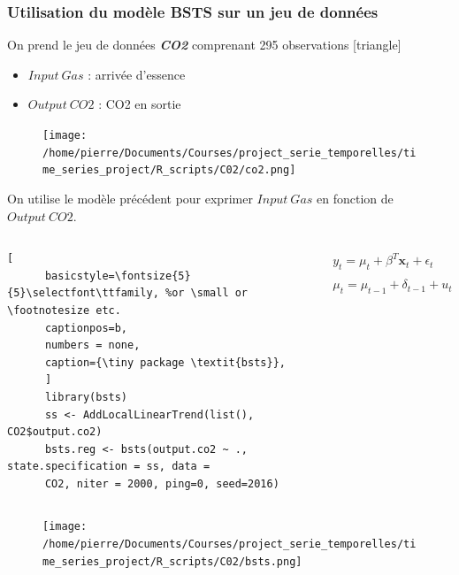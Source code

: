 \documentclass{presentation_template}
\begin{document}
\begin{frame}
  \frametitle{Utilisation du modèle BSTS sur un jeu de données}
  
  On prend le jeu de données \textbf{\textit{CO2}} comprenant 295 observations
  [triangle]
  \begin{itemize}
    \item $Input\ Gas$ : arrivée d'essence
    \item $Output\ CO2$ : CO2 en sortie
  \end{itemize}
  \begin{figure}
    \texttt{[image: /home/pierre/Documents/Courses/project\_serie\_temporelles/time\_series\_project/R\_scripts/C02/co2.png]} 
  \end{figure}
\end{frame}

\begin{frame}[fragile]
  \small On utilise le modèle précédent pour exprimer $Input\ Gas$ en fonction de $Output\ CO2$.
\begin{columns}
  \begin{column}{0.5\textwidth}
    \vspace{0.2cm}
    \begin{lstlisting}[
      basicstyle=\fontsize{5}{5}\selectfont\ttfamily, %or \small or \footnotesize etc.
      captionpos=b,
      numbers = none,
      caption={\tiny package \textit{bsts}},
      ]
      library(bsts)
      ss <- AddLocalLinearTrend(list(), CO2$output.co2)
      bsts.reg <- bsts(output.co2 ~ ., state.specification = ss, data =
      CO2, niter = 2000, ping=0, seed=2016)
    \end{lstlisting}
    
    \vspace{-0.5cm}
  \end{column}
  \begin{column}{0.5\textwidth}
    {\small
  $\begin{array}{ll}{y_{t}=\mu_{t}+\beta^{T} \mathbf{x}_{t}+\epsilon_{t}} & {\epsilon_{t} \sim \mathcal{}{}{N}\left(0, \sigma_{\epsilon}^{2}\right)} \\
   {\mu_{t}=\mu_{t-1}+\delta_{t-1}+u_{t}} & {u_{t} \sim \mathcal{N}\left(0, \sigma_{u}^{2}\right)}\end{array}$
    }
  \end{column}
\end{columns}
\begin{figure}
  \texttt{[image: /home/pierre/Documents/Courses/project\_serie\_temporelles/time\_series\_project/R\_scripts/C02/bsts.png]} 
\end{figure}
\end{frame}
\end{document}
